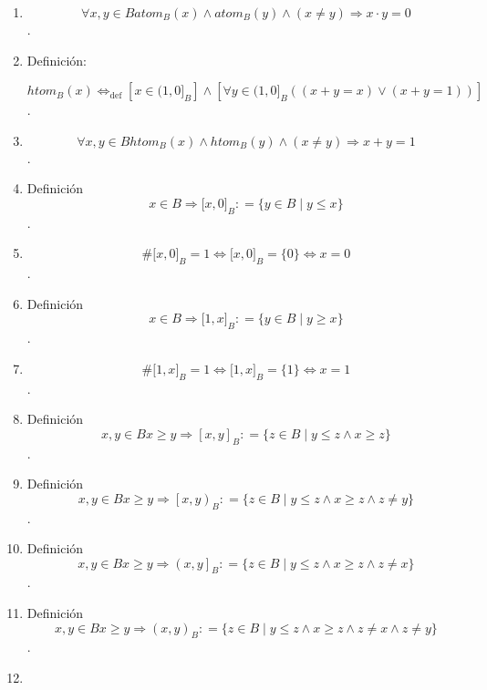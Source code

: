 \documentclass[
]{article}
\begin{document}
\begin{enumerate}
\begin{enumerate}
\begin{enumerate}
      \[\mathsf{\mathit{atom}}_{B}{(x)}\Leftrightarrow_{\text{def}}{\left\lbrack {x \in \lbrack 1,0)_{B}} \right\rbrack \land \left\lbrack {\forall{y \in \lbrack 1,0)_{B}}\left( {\left( {{x \cdot y} = x} \right) \vee \left( {{x \cdot y} = 0} \right)} \right)} \right\rbrack}\].
    \item
      \[\forall x,{y \in B}\mathsf{\mathit{atom}}_{B}{{(x)} \land \mathsf{\mathit{atom}}_{B}}{{(y)} \land {({x \neq y})}}\Rightarrow{{x \cdot y} = 0}\].
    \item
      Definición:

      \[\mathsf{\mathit{htom}}_{B}{(x)}\Leftrightarrow_{\text{def}}{\left\lbrack {x \in (1,0\rbrack_{B}} \right\rbrack \land \left\lbrack {\forall{y \in (1,0\rbrack_{B}}\left( {\left( {{x + y} = x} \right) \vee \left( {{x + y} = 1} \right)} \right)} \right\rbrack}\].
    \item
      \[\forall x,{y \in B}\mathsf{\mathit{htom}}_{B}{{(x)} \land \mathsf{\mathit{htom}}_{B}}{{(y)} \land {({x \neq y})}}\Rightarrow{{x + y} = 1}\].
    \item
      Definición\emph{\[{x \in B}\Rightarrow{\lbrack{x,0}\rbrack}_{B}{: = {\{{{y \in B} \mid {y \leq x}}\}}}\]}.
    \item
      \[\#{{\lbrack{x,0}\rbrack}_{B} = 1}\Leftrightarrow{{\lbrack{x,0}\rbrack}_{B} = {\{ 0\}}}\Leftrightarrow{x = 0}\].
    \item
      Definición\emph{\[{x \in B}\Rightarrow{\lbrack{1,x}\rbrack}_{B}{: = {\{{{y \in B} \mid {y \geq x}}\}}}\]}.
    \item
      \[\#{{\lbrack{1,x}\rbrack}_{B} = 1}\Leftrightarrow{{\lbrack{1,x}\rbrack}_{B} = {\{ 1\}}}\Leftrightarrow{x = 1}\].
    \item
      Definición\emph{\[x,{y \in B}{x \geq y}\Rightarrow\left\lbrack {x,y} \right\rbrack_{B}{: = {\{{{z \in B} \mid {{y \leq {z \land x}} \geq z}}\}}}\]}.
    \item
      Definición\emph{\[x,{y \in B}{x \geq y}\Rightarrow\left\lbrack {x,y} \right)_{B}{: = {\{{{z \in B} \mid {{{y \leq {z \land x}} \geq {z \land z}} \neq y}}\}}}\]}.
    \item
      Definición\emph{\[x,{y \in B}{x \geq y}\Rightarrow\left( {x,y} \right\rbrack_{B}{: = {\{{{z \in B} \mid {{{y \leq {z \land x}} \geq {z \land z}} \neq x}}\}}}\]}.
    \item
      Definición\emph{\[x,{y \in B}{x \geq y}\Rightarrow\left( {x,y} \right)_{B}{: = {\{{{z \in B} \mid {{{{y \leq {z \land x}} \geq {z \land z}} \neq {x \land z}} \neq y}}\}}}\]}.
    \item

\end{enumerate}
\end{enumerate}
\end{enumerate}
\end{document}
